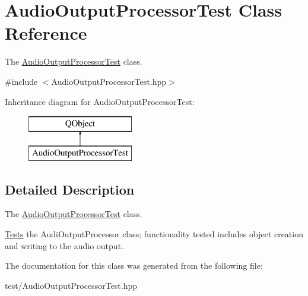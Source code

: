 \hypertarget{classAudioOutputProcessorTest}{\section{Audio\+Output\+Processor\+Test Class Reference}
\label{classAudioOutputProcessorTest}
}


The \hyperlink{classAudioOutputProcessorTest}{Audio\+Output\+Processor\+Test} class.  




{\ttfamily \#include $<$Audio\+Output\+Processor\+Test.\+hpp$>$}

Inheritance diagram for Audio\+Output\+Processor\+Test\+:\begin{figure}[H]
\begin{center}
\leavevmode
\includegraphics[height=2.000000cm]{classAudioOutputProcessorTest}
\end{center}
\end{figure}


\subsection{Detailed Description}
The \hyperlink{classAudioOutputProcessorTest}{Audio\+Output\+Processor\+Test} class. 

\hyperlink{structTests}{Tests} the Audi\+Output\+Processor class; functionality tested includes object creation and writing to the audio output. 

The documentation for this class was generated from the following file\+:\begin{DoxyCompactItemize}
\item 
test/Audio\+Output\+Processor\+Test.\+hpp\end{DoxyCompactItemize}
